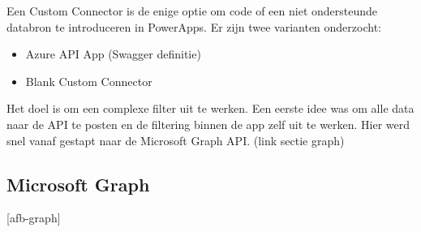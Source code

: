 Een Custom Connector is de enige optie om code of een niet ondersteunde databron te introduceren in PowerApps. Er zijn twee varianten onderzocht:
\begin{itemize}
    \item Azure API App (Swagger definitie)
    \item Blank Custom Connector
\end{itemize}
Het doel is om een complexe filter uit te werken. Een eerste idee was om alle data naar de API te posten en de filtering binnen de app zelf uit te werken. Hier werd snel vanaf gestapt naar de Microsoft Graph API. (link sectie graph)


\subsection{Microsoft Graph}

[afb-graph]


